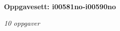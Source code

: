 \centerline{\bf Oppgavesett: i00581no-i00590no}
\vskip 10pt
\centerline{\it 10 oppgaver}\vskip 10pt
\vskip 10pt
